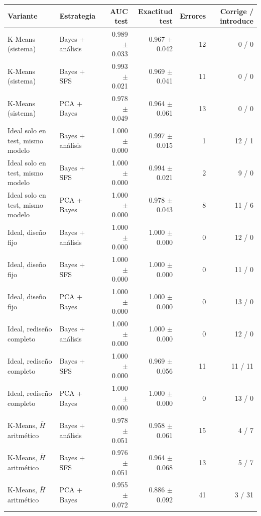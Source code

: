\footnotesize
\begin{tabular}{llrrrr}
\toprule
Variante & Estrategia & AUC test & Exactitud test & Errores & Corrige / introduce \\
\midrule
K-Means (sistema) & Bayes + análisis & 0.989 $\pm$ 0.033 & 0.967 $\pm$ 0.042 & 12 & 0 / 0 \\
K-Means (sistema) & Bayes + SFS & 0.993 $\pm$ 0.021 & 0.969 $\pm$ 0.041 & 11 & 0 / 0 \\
K-Means (sistema) & PCA + Bayes & 0.978 $\pm$ 0.049 & 0.964 $\pm$ 0.061 & 13 & 0 / 0 \\
\midrule
Ideal solo en test, mismo modelo & Bayes + análisis & 1.000 $\pm$ 0.000 & 0.997 $\pm$ 0.015 & 1 & 12 / 1 \\
Ideal solo en test, mismo modelo & Bayes + SFS & 1.000 $\pm$ 0.000 & 0.994 $\pm$ 0.021 & 2 & 9 / 0 \\
Ideal solo en test, mismo modelo & PCA + Bayes & 1.000 $\pm$ 0.000 & 0.978 $\pm$ 0.043 & 8 & 11 / 6 \\
\midrule
Ideal, diseño fijo & Bayes + análisis & 1.000 $\pm$ 0.000 & 1.000 $\pm$ 0.000 & 0 & 12 / 0 \\
Ideal, diseño fijo & Bayes + SFS & 1.000 $\pm$ 0.000 & 1.000 $\pm$ 0.000 & 0 & 11 / 0 \\
Ideal, diseño fijo & PCA + Bayes & 1.000 $\pm$ 0.000 & 1.000 $\pm$ 0.000 & 0 & 13 / 0 \\
\midrule
Ideal, rediseño completo & Bayes + análisis & 1.000 $\pm$ 0.000 & 1.000 $\pm$ 0.000 & 0 & 12 / 0 \\
Ideal, rediseño completo & Bayes + SFS & 1.000 $\pm$ 0.000 & 0.969 $\pm$ 0.056 & 11 & 11 / 11 \\
Ideal, rediseño completo & PCA + Bayes & 1.000 $\pm$ 0.000 & 1.000 $\pm$ 0.000 & 0 & 13 / 0 \\
\midrule
K-Means, $\bar H$ aritmético & Bayes + análisis & 0.978 $\pm$ 0.051 & 0.958 $\pm$ 0.061 & 15 & 4 / 7 \\
K-Means, $\bar H$ aritmético & Bayes + SFS & 0.976 $\pm$ 0.051 & 0.964 $\pm$ 0.068 & 13 & 5 / 7 \\
K-Means, $\bar H$ aritmético & PCA + Bayes & 0.955 $\pm$ 0.072 & 0.886 $\pm$ 0.092 & 41 & 3 / 31 \\
\bottomrule
\end{tabular}
